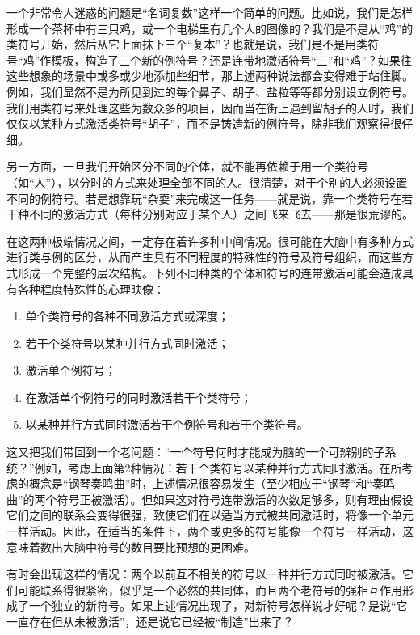 一个非常令人迷惑的问题是“名词复数”这样一个简单的问题。比如说，我们是怎样形成一个茶杯中有三只鸡，或一个电梯里有几个人的图像的？我们是不是从“鸡”的类符号开始，然后从它上面抹下三个“复本”？也就是说，我们是不是用类符号“鸡”作模板，构造了三个新的例符号？还是连带地激活符号“三”和“鸡”？如果往这些想象的场景中或多或少地添加些细节，那上述两种说法都会变得难于站住脚。例如，我们显然不是为所见到过的每个鼻子、胡子、盐粒等等都分别设立例符号。我们用类符号来处理这些为数众多的项目，因而当在街上遇到留胡子的人时，我们仅仅以某种方式激活类符号“胡子”，而不是铸造新的例符号，除非我们观察得很仔细。

另一方面，一旦我们开始区分不同的个体，就不能再依赖于用一个类符号（如“人”），以分时的方式来处理全部不同的人。很清楚，对于个别的人必须设置不同的例符号。若是想靠玩“杂耍”来完成这一任务——就是说，靠一个类符号在若干种不同的激活方式（每种分别对应于某个人）之间飞来飞去——那是很荒谬的。

在这两种极端情况之间，一定存在着许多种中间情况。很可能在大脑中有多种方式进行类与例的区分，从而产生具有不同程度的特殊性的符号及符号组织，而这些方式形成一个完整的层次结构。下列不同种类的个体和符号的连带激活可能会造成具有各种程度特殊性的心理映像：

\begin{enumerate}
\item 单个类符号的各种不同激活方式或深度；
\item 若干个类符号以某种并行方式同时激活；
\item 激活单个例符号；
\item 在激活单个例符号的同时激活若干个类符号；
\item 以某种并行方式同时激活若干个例符号和若干个类符号。
\end{enumerate}

这又把我们带回到一个老问题：“一个符号何时才能成为脑的一个可辨别的子系统？”例如，考虑上面第2种情况：若干个类符号以某种并行方式同时激活。在所考虑的概念是“钢琴奏鸣曲”时，上述情况很容易发生（至少相应于“钢琴”和“奏鸣曲”的两个符号正被激活）。但如果这对符号连带激活的次数足够多，则有理由假设它们之间的联系会变得很强，致使它们在以适当方式被共同激活时，将像一个单元一样活动。因此，在适当的条件下，两个或更多的符号能像一个符号一样活动，这意味着数出大脑中符号的数目要比预想的更困难。

有时会出现这样的情况：两个以前互不相关的符号以一种并行方式同时被激活。它们可能联系得很紧密，似乎是一个必然的共同体，而且两个老符号的强相互作用形成了一个独立的新符号。如果上述情况出现了，对新符号怎样说才好呢？是说“它一直存在但从未被激活”，还是说它已经被“制造”出来了？

